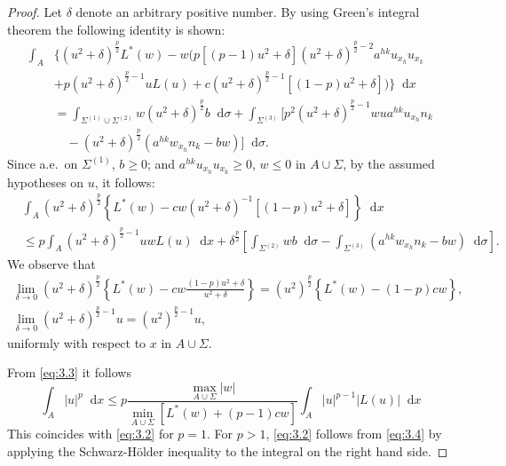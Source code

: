 \documentclass[a4paper,12pt,leqno]{article}
\numberwithin{equation}{section}
\newcommand{\dd}{\mathop{}\!\mathrm{d}}
\begin{document}
\begin{proof}
	Let $\delta$ denote an arbitrary positive number. 
	By using Green's integral theorem the following identity is shown:
	\begin{equation}
		\label{eq:3.3}
		\begin{split}
			\int_A & \{ 
			(u^2+\delta)^{\frac p 2} L^*(w) - w \big( p[(p-1)u^2+\delta] (u^2+\delta)^{\frac p 2 - 2} a^{hk} u_{x_h} u_{x_k} \\
			& + p(u^2+\delta)^{\frac p 2 -1} u L(u) + c (u^2+\delta)^{\frac p 2 - 1} [(1-p)u^2+\delta] \big) \} \dd x \\
			& = \int_{\Sigma^{(1)}\cup\Sigma^{(2)}} w(u^2+\delta)^{\frac p 2} b \dd \sigma + \int_{\Sigma^{(3)}} [p^2(u^2+\delta)^{\frac p 2 - 1} w u a^{hk}u_{x_h} n_k \\
			& \quad - (u^2+\delta)^{\frac p 2}(a^{hk}w_{x_h}n_k-bw)] \dd \sigma.			
		\end{split}
	\end{equation}
	Since a.e.\ on $\Sigma^{(1)}$, $b\geq0$; and $a^{hk}u_{x_h}u_{x_k} \geq 0$, $w \leq 0$ in $A\cup\Sigma$, by the assumed hypotheses on $u$, it follows:
	\begin{equation*}
		\begin{aligned}
			&\int_{A}\left(u^{2}+\delta\right)^{\frac{p}{2}}\left\{L^{*}(w)-c w\left(u^{2}+\delta\right)^{-1}\left[(1-p) u^{2}+\delta\right]\right\} \dd x \\
			&\leq p \int_{A}\left(u^{2}+\delta\right)^{\frac{p}{2}-1} u w L(u) \dd x+\delta^{\frac{p}{2}}\left[\int_{\Sigma^{(2)}} w b \dd \sigma-\int_{\Sigma^{(3)}}\left(a^{h k} w_{x_{h}} n_{k}-b w\right) \dd \sigma\right].
		\end{aligned}
	\end{equation*}
	We observe that 
	\begin{gather*}
		\lim_{\delta \rightarrow 0}\left(u^{2}+\delta\right)^{\frac{p}{2}}\left\{L^{*}(w)-c w\frac{(1-p) u^{2}+\delta}{u^{2}+\delta}\right\}=\left(u^{2}\right)^{\frac{p}{2}}\left\{L^{*}(w)-(1-p) c w\right\},
		\\
		\lim _{\delta \rightarrow 0}\left(u^{2}+\delta\right)^{\frac{p}{2}-1} u=\left(u^{2}\right)^{\frac{p}{2}-1} u,
	\end{gather*}
	uniformly with respect to $x$ in $A \cup \Sigma$.

	From \eqref{eq:3.3} it follows
	\begin{equation}
		\label{eq:3.4}
		\int_{A}|u|^{p} \dd x \leq p \frac{\max_{A\cup\Sigma} |w|}{\min_{A\cup\Sigma} \left[L^{*}(w)+(p-1) c w\right]} \int_{A}|u|^{p-1}|L(u)| \dd x
	\end{equation}
	This coincides with \eqref{eq:3.2} for $p=1$. 
	For $p>1$, \eqref{eq:3.2} follows from \eqref{eq:3.4} by applying the Schwarz-Hölder inequality to the integral on the right hand side.
\end{proof}
\end{document}
